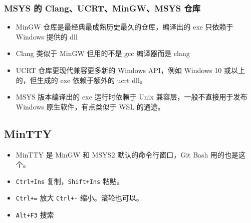 \subsubsection{MSYS 的 Clang、UCRT、MinGW、MSYS 仓库}
\begin{itemize}
\item MinGW 仓库是最经典最成熟历史最久的仓库，编译出的 exe 只依赖于 Windows 提供的 dll
\item Clang 类似于 MinGW 但用的不是 gcc 编译器而是 clang
\item UCRT 仓库更现代兼容更多新的 Windows API，例如 Windows 10 或以上的，但生成的 exe 依赖于额外的 ucrt dll。
\item MSYS 版本编译出的 exe 运行时依赖于 Unix 兼容层，一般不直接用于发布 Windows 原生软件，有点类似于 WSL 的通途。
\end{itemize}

\subsection{MinTTY}
\begin{itemize}
\item MinTTY 是 MinGW 和 MSYS2 默认的命令行窗口，Git Bash 用的也是这个。
\item \verb`Ctrl+Ins` 复制，\verb`Shift+Ins` 粘贴。
\item \verb`Ctrl+=` 放大 \verb`Ctrl+-` 缩小。滚轮也可以。
\item \verb`Alt+F3` 搜索
\end{itemize}
